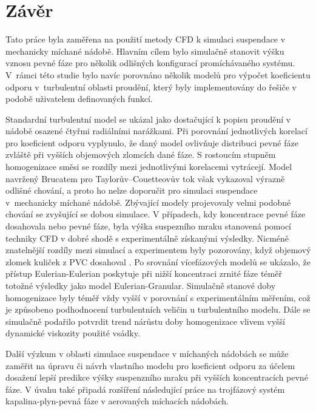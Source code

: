 \chapter{Závěr}
Tato práce byla zaměřena na použití metody CFD k simulaci suspendace v mechanicky míchané nádobě. Hlavním cílem bylo simulačně stanovit výšku vznosu pevné fáze pro několik odlišných konfigurací promíchávaného systému. V~rámci této studie bylo navíc porovnáno několik modelů pro výpočet koeficientu odporu v~turbulentní oblasti proudění, který byly implementovány do řešiče \flu{} v podobě uživatelem definovaných funkcí.

Standardní \keps{} turbulentní model se ukázal jako dostačující k popisu proudění v nádobě osazené čtyřmi radiálními narážkami. Při porovnání jednotlivých korelací pro koeficient odporu vyplynulo, že daný model ovlivňuje distribuci pevné fáze zvláště při vyšších objemových zlomcích dané fáze. S rostoucím stupněm homogenizace směsi se rozdíly mezi jednotlivými korelacemi vytrácejí. Model navržený Brucatem pro Taylorův–Couetteovův tok však vykazoval výrazně odlišné chování, a proto ho nelze doporučit pro simulaci suspendace v~mechanicky míchané nádobě. Zbývající modely projevovaly velmi podobné chování se zvyšující se dobou simulace. V případech, kdy koncentrace pevné fáze dosahovala  nebo  pevné fáze, byla výška suspezního mraku stanovená pomocí techniky CFD v dobré shodě s experimentálně získanými výsledky. Nicméně znatelnější rozdíly mezi simulací a experimentem byly pozorovány, když objemový zlomek kuliček z PVC dosahoval . Po srovnání vícefázových modelů se ukázalo, že přístup Eulerian-Eulerian poskytuje při nižší koncentraci zrnité fáze téměř totožné výsledky jako model Eulerian-Granular. Simulačně stanové doby homogenizace byly téměř vždy vyšší v porovnání s experimentálním měřením, což je způsobeno podhodnocení turbulentních veličin u \keps{} turbulentního modelu. Dále se simulačně podařilo potvrdit trend nárůstu doby homogenizace vlivem vyšší dynamické viskozity použité vsádky.

Další výzkum v oblasti simulace suspendace v míchaných nádobách se může zaměřit na úpravu či návrh vlastního modelu pro koeficient odporu za účelem dosažení lepší predikce výšky suspenzního mraku při vyšších koncentracích pevné fáze. V úvahu také připadá rozšíření následující práce na trojfázový systém kapalina-plyn-pevná fáze v ae\-ro\-va\-ných mí\-cha\-cích ná\-do\-bách.
